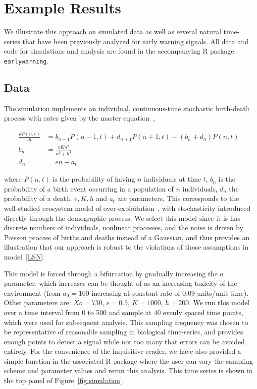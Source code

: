 \documentclass[authoryear,review,11pt]{elsarticle}
\begin{document}
\section{Example Results}
We illustrate this approach on simulated data as well as several natural time-series that have been previously analyzed for early warning signals.  All data and code for simulations and analysis are found in the accompanying R package, \verb|earlywarning|.


\subsection*{Data}
The simulation implements an individual, continuous-time stochastic birth-death process with rates given by the master equation~\citep{Gardiner2009},

\begin{align}
  \frac{dP(n,t)}{dt} &= b_{n-1} P(n-1,t) + d_{n+1}P(n+1,t) - (b_n+d_n) P(n,t)  \label{master} \\
    b_n &= \frac{e K n^2}{n^2 + h^2} \\
    d_n &= e n + a_t
\end{align}

where $P(n,t)$ is the probability of having $n$ individuals at time $t$, $b_n$ is the probability of a birth event occurring in a population of $n$ individuals, $d_n$ the probability of a death.  $e, K, h$ and $a_t$ are parameters.  
This corresponds to the well-studied ecosystem model of over-exploitation~\citep{Noy-Meir1975, May1977},
with stochasticity introduced directly through the demographic process.
We select this model since it is has discrete numbers of individuals, 
nonlinear processes, and the noise is driven by Poisson process of births and deaths instead of a Gaussian, 
and thus provides an illustration that our approach is robust to the violations of those
assumptions in model~\eqref{LSN}. 

This model is forced through a bifurcation by gradually increasing the $a$ parameter,
which increases can be thought of as an increasing toxicity of the environment
(from $a_0 = 100$ increasing at constant rate of 0.09 units/unit time).
Other parameters are: $Xo = 730$, $e = 0.5$, $K = 1000$, $h = 200$.
We run this model over a time interval from 0 to 500
and sample at 40 evenly spaced time points, which were used for subsequent analysis.
This sampling frequency was chosen to be representative of reasonable sampling in biological time-series,
and provides enough points to detect a signal while not too many that errors can be avoided entirely.  
For the convenience of the inquisitive reader, we have also provided a simple function in the
associated R package where the user can vary the sampling scheme and parameter values and rerun this analysis.
This time series is shown in the top panel of Figure~\ref{fig:simulation}.
\end{document}
